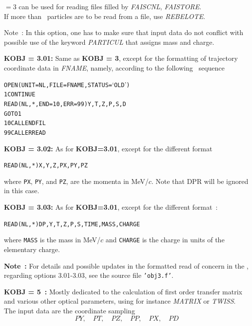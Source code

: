 \bigskip

\noindent\KOBJ $= 3 $    can be used for reading files filled by \textsl{FAISCNL}, \textsl{FAISTORE}.\\
If more than \IMAX\ particles are to be read from a file, use  \textsl{REBELOTE}.   

\bigskip

\noindent Note~: In this option, one has to make sure that input data do not conflict with possible use of 
the keyword \textsl{PARTICUL} that  assigns   mass and charge.

\bigskip

\noindent\textbf{KOBJ = 3.01:} Same as \textbf{KOBJ = 3}, except for the formatting of trajectory coordinate 
data in  \textsl{FNAME}, namely, according to the following \FORTRAN\ sequence 
\begin{alltt}
\footnotesize
         OPEN (UNIT = NL, FILE = FNAME, STATUS = `OLD')
    1    CONTINUE
         READ (NL,*,END=10,ERR=99) Y, T, Z, P, S, D
         GOTO 1
   10    CALL ENDFIL
   99    CALL ERREAD
\end{alltt} 

\bigskip

\noindent\textbf{KOBJ = 3.02:} As for \textbf{KOBJ=3.01}, except for the different format
\begin{alltt}
         READ(NL,*) X,Y,Z,PX,PY,PZ
\end{alltt}
where \texttt{PX}, \texttt{PY}, and \texttt{PZ}, are the momenta in
MeV/$c$.  Note that DPR will be ignored in this case.

\bigskip

\noindent\textbf{KOBJ = 3.03:} As for \textbf{KOBJ=3.01}, except for the different format~: 
\begin{alltt}
         READ(NL,*) DP,Y,T,Z,P,S,TIME,MASS,CHARGE
\end{alltt}
where \texttt{MASS} is the mass in MeV/$c$ and \texttt{CHARGE} is the
charge in units of the elementary charge.  



\bigskip

\noindent \textbf{Note~:}  For details and possible updates in the formatted read of concern in the \FORTRAN, 
regarding options 3.01-3.03, see the source file \texttt{'obj3.f'}.


\bigskip


\noindent\textbf{KOBJ = 5~:} Mostly dedicated to the calculation of first order
transfer matrix and various other  optical parameters, 
 using for instance \textsl{MATRIX} or \textsl{TWISS}.  
The input data are the coordinate sampling 
\smallskip
$$ PY,\quad PT,\quad PZ,\quad PP, \quad PX, \quad PD $$

